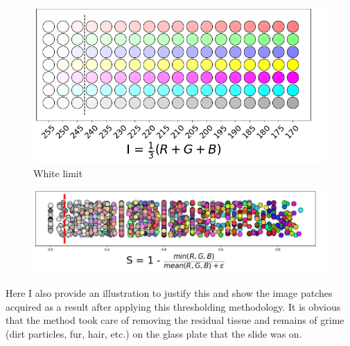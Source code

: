 \documentclass[a4paper,12pt]{article}
\begin{document}
\begin{figure}[H]
    \centering
    \includegraphics[width=.6\textwidth]{intensity.png}
    \caption{White limit}
    \label{fig:intensity}
\end{figure}

\begin{figure}[H]
    \centering
    \includegraphics[width=.7\textwidth]{saturation.png}
    \label{fig:saturation}
\end{figure}

\vspace{4mm}

\par Here I also provide an illustration to justify this and show the image patches acquired as a result after applying this thresholding methodology. It is obvious that the method took care of removing the residual tissue and remains of grime (dirt particles, fur, hair, etc.) on the glass plate that the slide was on.

\vspace{10mm}
\end{document}
